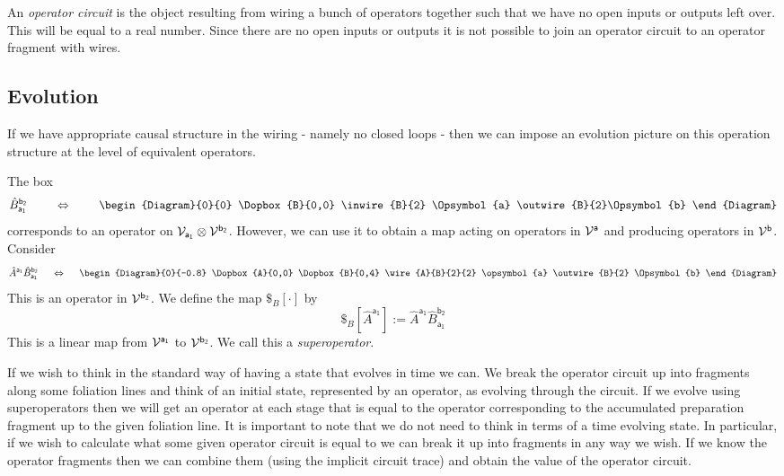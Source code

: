 \documentclass[10pt]{article}
\begin{document}
An \emph{operator circuit}  is the object resulting from wiring a bunch of operators together such that we have no open inputs or outputs left over.  This will be equal to a real number.  Since there are no open inputs or outputs it is not possible to join an operator circuit to an operator fragment with wires.







\subsection{Evolution}\label{evolutionsection}

If we have appropriate causal structure in the wiring - namely no closed loops - then we can impose an evolution picture on this operation structure at the level of equivalent operators.

The box
\begin{equation}
\hat B_\mathsf{a_1}^\mathsf{b_2}
~~~~~~~ \Leftrightarrow ~~~~~~~
\begin{Diagram}{0}{0}
\Dopbox{B}{0,0}
\inwire{B}{2} \Opsymbol{a} \outwire{B}{2}\Opsymbol{b}
\end{Diagram}
\end{equation}
corresponds to an operator on ${\cal V}_\mathsf{a_1}\otimes{\cal V}^\mathsf{b_2}$.  However, we can use it to obtain a map acting on operators in ${\cal V}^\mathsf{a}$ and producing operators in ${\cal V}^\mathsf{b}$.  Consider
\begin{equation}
\hat A^\mathsf{a_1} \hat B_\mathsf{a_1}^\mathsf{b_2}
~~~~\Leftrightarrow~~~~
\begin{Diagram}{0}{-0.8}
\Dopbox{A}{0,0}
\Dopbox{B}{0,4}
\wire{A}{B}{2}{2} \opsymbol{a}
\outwire{B}{2} \Opsymbol{b}
\end{Diagram}
\end{equation}
This is an operator in ${\cal V}^\mathsf{b_2}$.  We define the map $\$_B[\cdot]$ by
\begin{equation}\label{evolutionequation}
\$_B[\hat A^\mathsf{a_1}]:= \hat A^\mathsf{a_1} \hat B_\mathsf{a_1}^\mathsf{b_2}
\end{equation}
This is a linear map from ${\cal V}^\mathsf{a_1}$ to ${\cal V}^\mathsf{b_2}$.  We call this a \emph{superoperator}.

If we wish to think in the standard way of having a state that evolves in time we can.   We break the operator circuit up into fragments along some foliation lines and think of an initial state, represented by an operator, as evolving through the circuit.  If we evolve using superoperators then we will get an operator at each stage that is equal to the operator corresponding to the accumulated preparation fragment up to the given foliation line.  It is important to note that we do not need to think in terms of a time evolving state.  In particular, if we wish to calculate what some given operator circuit is equal to we can break it up into fragments in any way we wish. If we know the operator fragments then we can combine them (using the implicit circuit trace) and obtain the value of the operator circuit.
\end{document}
